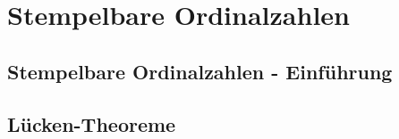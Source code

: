 \section{Stempelbare Ordinalzahlen}

\subsection{Stempelbare Ordinalzahlen - Einführung}


\subsection{Lücken-Theoreme}

